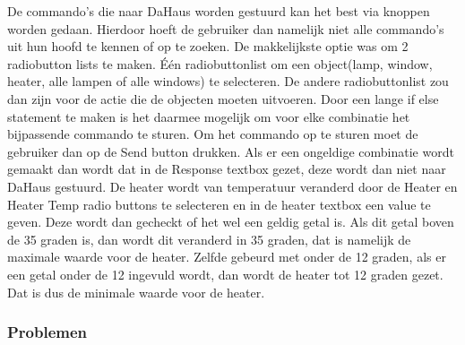 \documentclass[11pt]{article}
\begin{document}
	De commando's die naar DaHaus worden gestuurd kan het best via knoppen worden gedaan. Hierdoor hoeft de gebruiker dan namelijk niet alle commando's uit hun hoofd te kennen of op te zoeken. De makkelijkste optie was om 2 radiobutton lists te maken. \'{E}\'{e}n radiobuttonlist om een object(lamp, window, heater, alle lampen of alle windows) te selecteren. De andere radiobuttonlist zou dan zijn voor de actie die de objecten moeten uitvoeren. Door een lange if else statement te maken is het daarmee mogelijk om voor elke combinatie het bijpassende commando te sturen. Om het commando op te sturen moet de gebruiker dan op de Send button drukken. Als er een ongeldige combinatie wordt gemaakt dan wordt dat in de Response textbox gezet, deze wordt dan niet naar DaHaus gestuurd. De heater wordt van temperatuur veranderd door de Heater en Heater Temp radio buttons te selecteren en in de heater textbox een value te geven. Deze wordt dan gecheckt of het wel een geldig getal is. Als dit getal boven de 35 graden is, dan wordt dit veranderd in 35 graden, dat is namelijk de maximale waarde voor de heater. Zelfde gebeurd met onder de 12 graden, als er een getal onder de 12 ingevuld wordt, dan wordt de heater tot 12 graden gezet. Dat is dus de minimale waarde voor de heater. 
	\subsubsection{Problemen}
	
\end{document}
